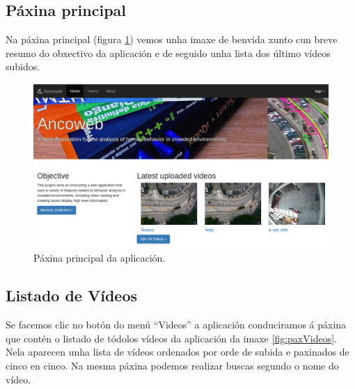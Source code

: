 \documentclass[11pt, a4paper, twoside, titlepage]{book}
\begin{document}
    \subsection{Páxina principal}
    
    Na páxina principal (figura \ref{fig:paxPrincipal}) vemos unha imaxe de benvida xunto cun breve 
    resumo do obxectivo da aplicación e de seguido unha lista dos último vídeos subidos.
    
        \begin{figure}[htp]
        \begin{center}
            \includegraphics[scale=0.4]{figures/paxPrincipal.png}
            \caption{Páxina principal da aplicación.}
        \label{fig:paxPrincipal}
        \end{center}
        \end{figure}

    \subsection{Listado de Vídeos}

    Se facemos clic no botón do menú ``Videos'' a aplicación conduciramos á páxina que contén o listado de 
    tódolos vídeos da aplicación da imaxe \ref{fig:paxVideos}. Nela aparecen unha lista de vídeos 
    ordenados por orde de subida e paxinados de cinco en cinco. Na mesma páxina podemos realizar
    buscas segundo o nome do vídeo.
    
\end{document}
